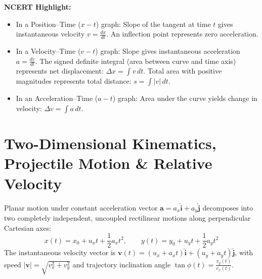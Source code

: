 \documentclass[10pt,twoside,openright]{book}
\begin{document}
\begin{ncertbox}
\textbf{NCERT Highlight:}
\begin{itemize}
  \item In a Position--Time ($x-t$) graph: Slope of the tangent at time $t$ gives instantaneous velocity $v = \frac{dx}{dt}$. An inflection point represents zero acceleration.
  \item In a Velocity--Time ($v-t$) graph: Slope gives instantaneous acceleration $a = \frac{dv}{dt}$. The signed definite integral (area between curve and time axis) represents net displacement: $\Delta x = \int v\,dt$. Total area with positive magnitudes represents total distance: $s = \int |v|\,dt$.
  \item In an Acceleration--Time ($a-t$) graph: Area under the curve yields change in velocity: $\Delta v = \int a\,dt$.
\end{itemize}
\end{ncertbox}

\section{Two-Dimensional Kinematics, Projectile Motion \& Relative Velocity}

\begin{conceptbox}
Planar motion under constant acceleration vector $\mathbf{a} = a_x \hat{\mathbf{i}} + a_y \hat{\mathbf{j}}$ decomposes into two completely independent, uncoupled rectilinear motions along perpendicular Cartesian axes:
\begin{equation}
  x(t) = x_0 + u_x t + \frac{1}{2}a_x t^2, \qquad y(t) = y_0 + u_y t + \frac{1}{2}a_y t^2
\end{equation}
The instantaneous velocity vector is $\mathbf{v}(t) = (u_x + a_x t)\hat{\mathbf{i}} + (u_y + a_y t)\hat{\mathbf{j}}$, with speed $|\mathbf{v}| = \sqrt{v_x^2 + v_y^2}$ and trajectory inclination angle $\tan\phi(t) = \frac{v_y(t)}{v_x(t)}$.
\end{conceptbox}
\end{document}
